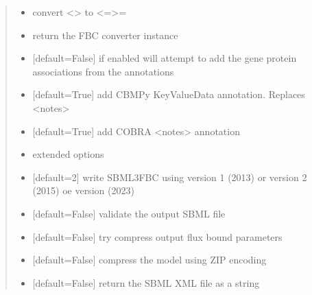 \documentclass[letterpaper,12pt,english]{sphinxmanual}
\begin{document}
\begin{fulllineitems}
\begin{quote}
\begin{description}
\begin{itemize}
\item {} 
\sphinxAtStartPar
{} \textendash{} convert \textless{}\textgreater{} to \textless{}=\textgreater{}=

\item {} 
\sphinxAtStartPar
{} \textendash{} return the FBC converter instance

\item {} 
\sphinxAtStartPar
{} \textendash{} {[}default=False{]} if enabled will attempt to add the gene protein associations from the annotations

\item {} 
\sphinxAtStartPar
{} \textendash{} {[}default=True{]} add CBMPy KeyValueData annotation. Replaces \textless{}notes\textgreater{}

\item {} 
\sphinxAtStartPar
{} \textendash{} {[}default=True{]} add COBRA \textless{}notes\textgreater{} annotation

\item {} 
\sphinxAtStartPar
{} \textendash{} extended options

\item {} 
\sphinxAtStartPar
{} \textendash{} {[}default=2{]} write SBML3FBC using version 1 (2013) or version 2 (2015) oe version (2023)

\item {} 
\sphinxAtStartPar
{} \textendash{} {[}default=False{]} validate the output SBML file

\item {} 
\sphinxAtStartPar
{} \textendash{} {[}default=False{]} try compress output flux bound parameters

\item {} 
\sphinxAtStartPar
{} \textendash{} {[}default=False{]} compress the model using ZIP encoding

\item {} 
\sphinxAtStartPar
{} \textendash{} {[}default=False{]} return the SBML XML file as a string

\end{itemize}

\end{description}\end{quote}

\end{fulllineitems}
\end{document}
